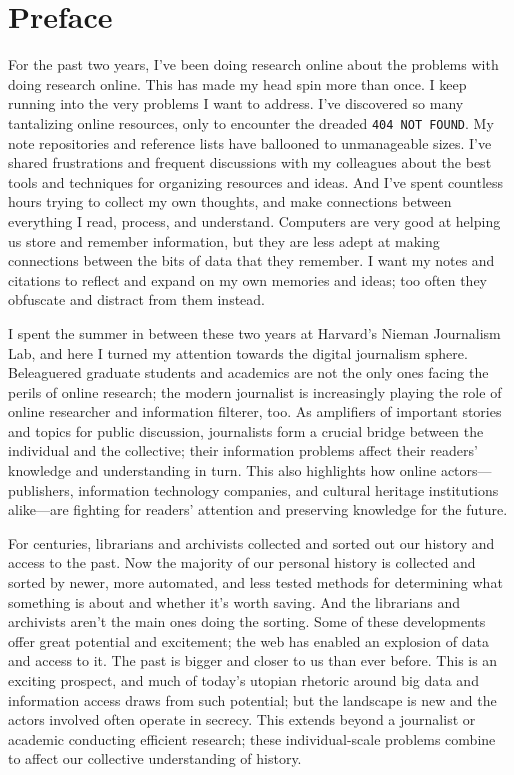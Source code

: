 \section{Preface}


For the past two years, I've been doing research online about the problems with doing research online. This has made my head spin more than once. I keep running into the very problems I want to address. I've discovered so many tantalizing online resources, only to encounter the dreaded \texttt{404 NOT FOUND}. My note repositories and reference lists have ballooned to unmanageable sizes. I've shared frustrations and frequent discussions with my colleagues about the best tools and techniques for organizing resources and ideas. And I've spent countless hours trying to collect my own thoughts, and make connections between everything I read, process, and understand. Computers are very good at helping us store and remember information, but they are less adept at making connections between the bits of data that they remember. I want my notes and citations to reflect and expand on my own memories and ideas; too often they obfuscate and distract from them instead.

I spent the summer in between these two years at Harvard's Nieman Journalism Lab, and here I turned my attention towards the digital journalism sphere. Beleaguered graduate students and academics are not the only ones facing the perils of online research; the modern journalist is increasingly playing the role of online researcher and information filterer, too. As amplifiers of important stories and topics for public discussion, journalists form a crucial bridge between the individual and the collective; their information problems affect their readers' knowledge and understanding in turn. This also highlights how online actors---publishers, information technology companies, and cultural heritage institutions alike---are fighting for readers' attention and preserving knowledge for the future.

For centuries, librarians and archivists collected and sorted out our history and access to the past. Now the majority of our personal history is collected and sorted by newer, more automated, and less tested methods for determining what something is about and whether it's worth saving. And the librarians and archivists aren't the main ones doing the sorting. Some of these developments offer great potential and excitement; the web has enabled an explosion of data and access to it. The past is bigger and closer to us than ever before. This is an exciting prospect, and much of today's utopian rhetoric around big data and information access draws from such potential; but the landscape is new and the actors involved often operate in secrecy. This extends beyond a journalist or academic conducting efficient research; these individual-scale problems combine to affect our collective understanding of history.

